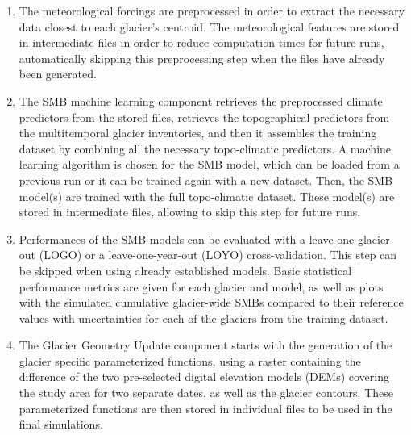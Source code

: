 \begin{enumerate}
\item The meteorological forcings are preprocessed in order to extract the necessary data closest to each glacier’s centroid. The meteorological features are stored in intermediate files in order to reduce computation times for future runs, automatically skipping this preprocessing step when the files have already been generated.
\item The SMB machine learning component retrieves the preprocessed climate predictors from the stored files, retrieves the topographical predictors from the multitemporal glacier inventories, and then it assembles the training dataset by combining all the necessary topo-climatic predictors. A machine learning algorithm is chosen for the SMB model, which can be loaded from a previous run or it can be trained again with a new dataset. Then, the SMB model(s) are trained with the full topo-climatic dataset. These model(s) are stored in intermediate files, allowing to skip this step for future runs.
\item Performances of the SMB models can be evaluated with a leave-one-glacier-out (LOGO) or a leave-one-year-out (LOYO) cross-validation. This step can be skipped when using already established models. Basic statistical performance metrics are given for each glacier and model, as well as plots with the simulated cumulative glacier-wide SMBs compared to their reference values with uncertainties for each of the glaciers from the training dataset.
\item The Glacier Geometry Update component starts with the generation of the glacier specific parameterized functions, using a raster containing the difference of the two pre-selected digital elevation models (DEMs) covering the study area for two separate dates, as well as the glacier contours. These parameterized functions are then stored in individual files to be used in the final simulations.

\end{enumerate}
